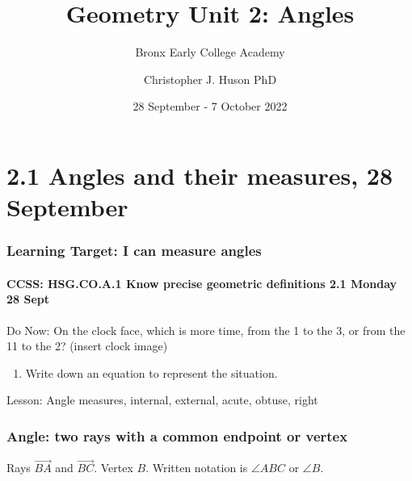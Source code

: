 \documentclass{beamer}
\title{Geometry Unit 2: Angles}
\subtitle[BECA]{Bronx Early College Academy}
\author[Huson]{Christopher J. Huson PhD}
\date{28 September - 7 October 2022}
\begin{document}
\frame{\titlepage}

\section[Outline]{}
\frame{\tableofcontents}

\section{2.1 Angles and their measures, 28 September}
\frame
{
  \frametitle{Learning Target: I can measure angles}
  \framesubtitle{CCSS: HSG.CO.A.1 Know precise geometric definitions  \hfill \alert{2.1 Monday 28 Sept}}

  \begin{block}{Do Now: On the clock face, which is more time, from the 1 to the 3, or from the 11 to the 2? (insert clock image)}
  \begin{enumerate}
    \item Write down an equation to represent the situation.
  \end{enumerate}
  \end{block}
  Lesson: Angle measures, internal, external, acute, obtuse, right
}

\frame
{
  \frametitle{Angle: two rays with a common endpoint or vertex}
  Rays $\overrightarrow{BA}$ and $\overrightarrow{BC}$. Vertex $B$.
  Written notation is $\angle ABC$ or $\angle B$. \\[0.75cm]
        \begin{center}
          \end{center}
}
\end{document}
